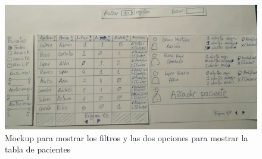 \begin{figure}[!htbp]
    \centering
    \includegraphics[scale=0.3]{Imagenes/anxA10.jpg}
    \caption[Mockup para mostrar los filtros y las dos opciones para mostrar la tabla de pacientes]{Mockup para mostrar los filtros y las dos opciones para mostrar la tabla de pacientes}
    \label{fig:c4:mockup18}
\end{figure}

